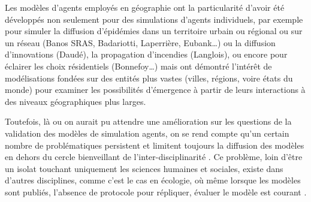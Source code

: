 
Les modèles d’agents employés en géographie ont la particularité d’avoir été développés non seulement pour des simulations d’agents individuels, par exemple pour simuler la diffusion d’épidémies dans un territoire urbain ou régional ou sur un réseau (Banos SRAS, Badariotti, Laperrière, Eubank…) ou la diffusion d’innovations (Daudé), la propagation d’incendies (Langlois), ou encore pour éclairer les choix résidentiels (Bonnefoy…) mais ont démontré l’intérêt de modélisations fondées sur des entités plus vastes (villes, régions, voire états du monde) pour examiner les possibilités d’émergence à partir de leurs interactions à des niveaux géographiques plus larges. 


Toutefois, là ou on aurait pu attendre une amélioration sur les questions de la validation des modèles de simulation agents, on se rend compte qu'un certain nombre de problématiques persistent et limitent toujours la diffusion des modèles en dehors du cercle bienveillant de l'inter-disciplinarité \autocite{Richiardi2006}. Ce problème, loin d'être un isolat touchant uniquement les sciences humaines et sociales, existe dans d'autres disciplines, comme c'est le cas en écologie, où même lorsque les modèles sont publiés, l'absence de protocole pour répliquer, évaluer le modèle est courant \autocite{Grimm1999}.

